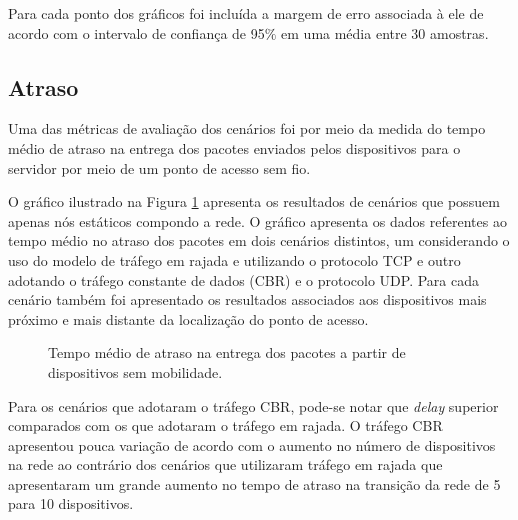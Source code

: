 \documentclass[12pt]{article}
\begin{document}
Para cada ponto dos gráficos foi incluída a margem de erro associada à ele de acordo com o intervalo de confiança de 95$\%$ em uma média entre 30 amostras.

\subsection{Atraso}\label{subsec:atraso}

Uma das métricas de avaliação dos cenários foi por meio da medida do tempo médio de atraso na entrega dos pacotes enviados pelos dispositivos para o servidor por meio de um ponto de acesso sem fio.

O gráfico ilustrado na Figura \ref{fig:delay_static} apresenta os resultados de cenários que possuem apenas nós estáticos compondo a rede. O gráfico apresenta os dados referentes ao tempo médio no atraso dos pacotes em dois cenários distintos, um considerando o uso do modelo de tráfego em rajada e utilizando o protocolo TCP e outro adotando o tráfego constante de dados (CBR) e o protocolo UDP. Para cada cenário também foi apresentado os resultados associados aos dispositivos mais próximo e mais distante da localização do ponto de acesso.

\begin{figure}[H]
\begin{center}
{%
\setlength{\fboxsep}{2pt}%
\setlength{\fboxrule}{1pt}%
%
}
\end{center}
\caption{Tempo médio de atraso na entrega dos pacotes a partir de dispositivos sem mobilidade.}
\label{fig:delay_static}
\end{figure}

Para os cenários que adotaram o tráfego CBR, pode-se notar que \textit{delay} superior comparados com os que adotaram o tráfego em rajada. O tráfego CBR apresentou pouca variação de acordo com o aumento no número de dispositivos na rede ao contrário dos cenários que utilizaram tráfego em rajada que apresentaram um grande aumento no tempo de atraso na transição da rede de 5 para 10 dispositivos.
\end{document}
